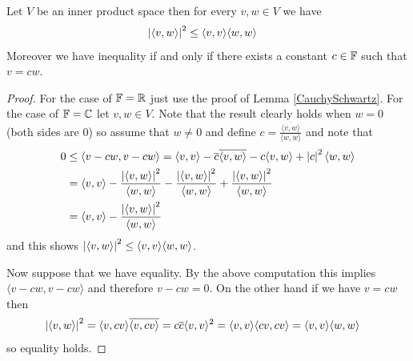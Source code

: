 \begin{prop}\label{hilbert:CauchySchwartz}Let $V$ be an inner product space then for every $v, w \in V$ we have
\begin{align*}
\left \vert \langle v, w \rangle \right \vert^2 &\leq \langle v,v \rangle \langle w,w \rangle
\end{align*}
Moreover we have inequality if and only if there exists a constant $c \in \mathbb{F}$ such that $v = c w$.
\end{prop}
\begin{proof}
For the case of $\mathbb{F} = \mathbb{R}$ just use the proof of Lemma \ref{CauchySchwartz}.  For the case of $\mathbb{F} = \mathbb{C}$ let $v, w \in V$.  Note that the result clearly holds when $w=0$ (both sides are $0$) so assume that $w \neq 0$ and define $c = \frac{\overline{\langle v, w \rangle}}{\langle w, w \rangle}$ and note that
\begin{align*}
0 &\leq \langle v - c w , v - c w \rangle = \langle v, v \rangle - \overline{c} \overline{\langle v, w \rangle} - c \langle v, w \rangle + \left \vert c \right \vert^2 \langle w, w \rangle \\
&= \langle v, v \rangle - \frac{\left \vert \langle v, w \rangle \right \vert^2}{\langle w, w \rangle} - \frac{\left \vert \langle v, w \rangle \right \vert^2}{\langle w, w \rangle} + \frac{\left \vert \langle v, w \rangle \right \vert^2}{\langle w, w \rangle}  \\
&=\langle v, v \rangle - \frac{\left \vert \langle v, w \rangle \right \vert^2}{\langle w, w \rangle}
\end{align*}
and this shows $\left \vert \langle v, w \rangle \right \vert^2 \leq \langle v,v \rangle \langle w,w \rangle$.

Now suppose that we have equality.  By the above computation this implies $\langle v - c w , v - c w \rangle$ and therefore $v - cw =0$.  On the other hand if we have $v = cw$ then
\begin{align*}
\left \vert \langle v, w \rangle \right \vert^2 &=  \langle v, c v \rangle \overline{\langle  v, c v \rangle} = c \overline{c} \langle v, v \rangle^2 = \langle v, v \rangle \langle cv, cv \rangle 
= \langle v, v \rangle \langle w, w \rangle
\end{align*}
so equality holds.
\end{proof}

